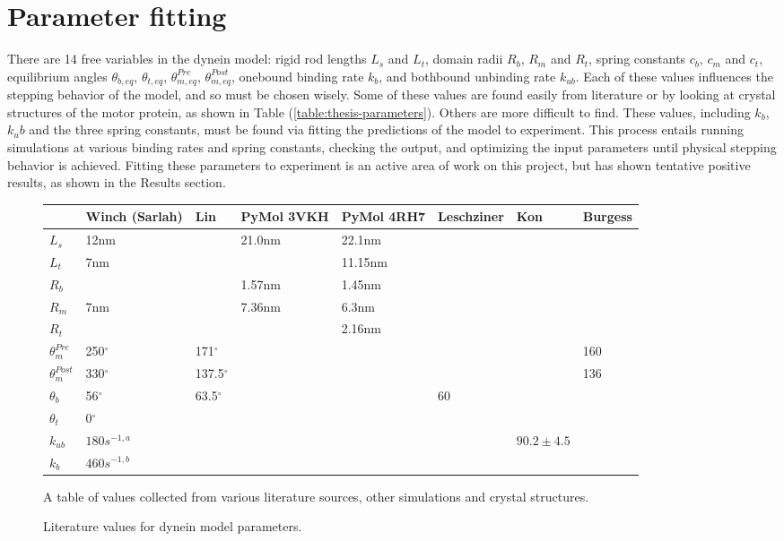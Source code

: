 \documentclass[
11pt, %
english, %
singlespacing, %
headsepline, %
chapterinoneline, %
]{MastersDoctoralThesis} %
\begin{document}
\section{Parameter fitting}
There are 14 free variables in the dynein model: rigid rod lengths $L_s$ and $L_t$, domain radii $R_b$, $R_m$ and $R_t$, spring constants $c_b$, $c_m$ and $c_t$, equilibrium angles $\theta_{b,eq}$, $\theta_{t,eq}$, $\theta_{m,eq}^{Pre}$, $\theta_{m,eq}^{Post}$, onebound binding rate $k_b$, and bothbound unbinding rate $k_{ub}$. Each of these values influences the stepping behavior of the model, and so must be chosen wisely. Some of these values are found easily from literature or by looking at crystal structures of the motor protein, as shown in Table (\ref{table:thesis-parameters}). Others are more difficult to find. These values, including $k_b$, $k_ub$ and the three spring constants, must be found via fitting the predictions of the model to experiment. This process entails running simulations at various binding rates and spring constants, checking the output, and optimizing the input parameters until physical stepping behavior is achieved. Fitting these parameters to experiment is an active area of work on this project, but has shown tentative positive results, as shown in the Results section.\\

\begin{figure}[h]
  \centering
  \begin{tabular}{| l | l | l | l | l | l | l | l |}
    \hline
    & Winch (Sarlah) & Lin & PyMol 3VKH & PyMol 4RH7 & Leschziner \cite{leschziner} & Kon & Burgess \\\hline
    $L_s$ & 12nm && 21.0nm & 22.1nm & & & \\ \hline
    $L_t$ &  7nm && & 11.15nm & & & \\ \hline
    $R_b$ &  && 1.57nm & 1.45nm & & & \\ \hline
    $R_m$ &  7nm && 7.36nm & 6.3nm & & & \\ \hline
    $R_t$ &  & & &2.16nm & & & \\ \hline
    $\theta_{m}^{Pre}$ & 250$^{\circ}$ &171$^{\circ}$ & & & & & 160\\ \hline
    $\theta_{m}^{Post}$ & 330$^{\circ}$ &137.5$^{\circ}$ & & & & & 136\\ \hline
    $\theta_{b}$ & 56$^{\circ}$ &63.5$^{\circ}$ & & & 60 & & \\ \hline
    $\theta_{t}$ & 0$^{\circ}$ && & & & & \\ \hline
    $k_{ub}$ & $180 s^{-1,a}$ && & & & $90.2 \pm 4.5$& \\ \hline
    $k_b$ & $460 s^{-1,b}$ && & & & & \\ \hline
  \end{tabular}
  \caption{Literature values for dynein model parameters.}{A table of values collected from various literature sources, other simulations and crystal structures.}
  \label{table:parameter-table}
\end{figure}
\end{document}
